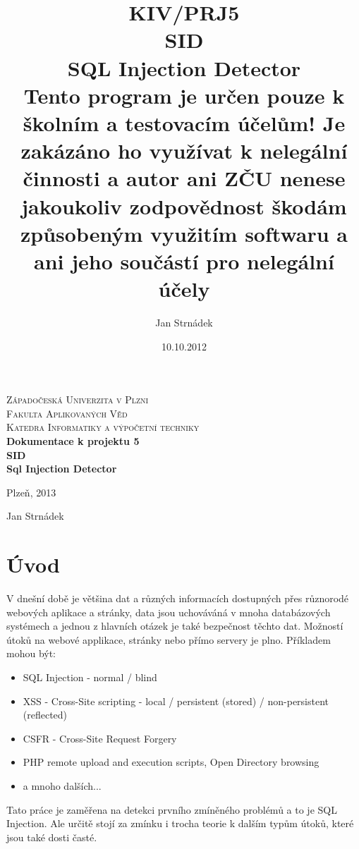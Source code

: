 \documentclass[12pt, a4paper]{report}
\begin{document}
\author{Jan Strnádek}
\date{10.10.2012}
\title{KIV/PRJ5\\SID\\\small{SQL Injection Detector\\Tento program je určen pouze k školním a testovacím účelům! Je zakázáno ho využívat k nelegální činnosti a autor ani ZČU nenese jakoukoliv zodpovědnost škodám způsobeným využitím softwaru a ani jeho součástí pro nelegální účely}}
\begin{titlepage}
\begin{center}
\textsc{\Large Západočeská Univerzita v Plzni}
\\[0.3cm]
\textsc{\Large Fakulta Aplikovaných Věd}
\\[0.3cm]
\textsc{\Large Katedra Informatiky a výpočetní techniky}
\\[6cm]
\textbf{\LARGE Dokumentace k projektu 5}
\\[3cm]
\textbf{\LARGE SID\\[0.3cm] Sql Injection Detector}
\\[7cm]
\begin{minipage}{0.4\textwidth}
\begin{flushleft}
\large
Plzeň, 2013
\end{flushleft}
\end{minipage}
\begin{minipage}{0.4\textwidth}
\begin{flushright} 
Jan Strnádek
\end{flushright}
\end{minipage}
\vfill
\end{center}
\end{titlepage}
\tableofcontents
\chapter{Úvod}
V dnešní době je většina dat a různých informacích dostupných přes různorodé webových aplikace a stránky, data jsou uchováváná v mnoha databázových systémech a jednou z hlavních otázek je také bezpečnost těchto dat. Možností útoků na webové applikace, stránky nebo přímo servery je plno. Příkladem mohou být:
\begin{itemize}
\item SQL Injection - normal / blind
\item XSS - Cross-Site scripting - local / persistent (stored) / non-persistent (reflected)
\item CSFR - Cross-Site Request Forgery 
\item PHP remote upload and execution scripts, Open Directory browsing
\item a mnoho dalších...
\end{itemize}
Tato práce je zaměřena na detekci prvního zmíněného problémů a to je SQL Injection. Ale určitě stojí za zmínku i trocha teorie k dalším typům útoků, které jsou také dosti časté.
\end{document}
